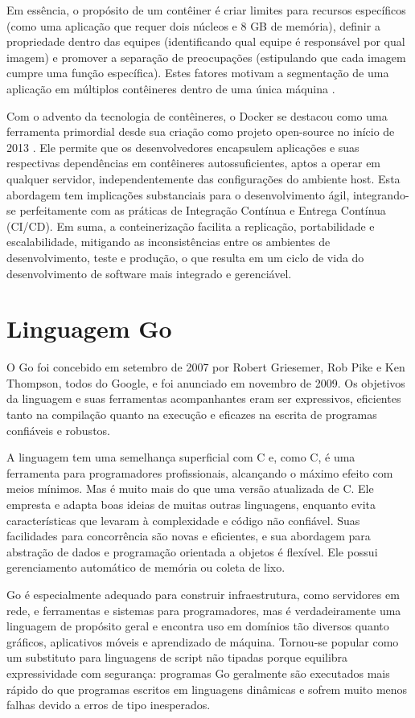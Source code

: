 \documentclass[12pt, %
openright, 
oneside, %
a4paper,    %
brazil]{facom-ufu-abntex2}
\begin{document}
Em essência, o propósito de um contêiner é criar limites para recursos
específicos (como uma aplicação que requer dois núcleos e 8 GB de memória),
definir a propriedade dentro das equipes (identificando qual equipe é
responsável por qual imagem) e promover a separação de preocupações
(estipulando que cada imagem cumpre uma função específica). Estes fatores
motivam a segmentação de uma aplicação em múltiplos contêineres dentro de uma
única máquina \cite{burns2018designingpart1}.

Com o advento da tecnologia de contêineres, o Docker se destacou como uma
ferramenta primordial desde sua criação como projeto open-source no início de
2013 \cite{merkel2014}. Ele permite que os desenvolvedores encapsulem
aplicações e suas respectivas dependências em contêineres autossuficientes,
aptos a operar em qualquer servidor, independentemente das configurações do
ambiente host. Esta abordagem tem implicações substanciais para o
desenvolvimento ágil, integrando-se perfeitamente com as práticas de Integração
Contínua e Entrega Contínua (CI/CD). Em suma, a conteinerização facilita a
replicação, portabilidade e escalabilidade, mitigando as inconsistências entre
os ambientes de desenvolvimento, teste e produção, o que resulta em um ciclo de
vida do desenvolvimento de software mais integrado e gerenciável.

\section{Linguagem Go}

O Go foi concebido em setembro de 2007 por Robert Griesemer, Rob Pike e Ken
Thompson, todos do Google, e foi anunciado em novembro de 2009. Os objetivos da
linguagem e suas ferramentas acompanhantes eram ser expressivos, eficientes
tanto na compilação quanto na execução e eficazes na escrita de programas
confiáveis e robustos.

A linguagem tem uma semelhança superficial com C e, como C, é uma ferramenta
para programadores profissionais, alcançando o máximo efeito com meios mínimos.
Mas é muito mais do que uma versão atualizada de C. Ele empresta e adapta boas
ideias de muitas outras linguagens, enquanto evita características que levaram
à complexidade e código não confiável. Suas facilidades para concorrência são
novas e eficientes, e sua abordagem para abstração de dados e programação
orientada a objetos é flexível. Ele possui gerenciamento automático de memória
ou coleta de lixo.

Go é especialmente adequado para construir infraestrutura, como servidores em
rede, e ferramentas e sistemas para programadores, mas é verdadeiramente uma
linguagem de propósito geral e encontra uso em domínios tão diversos quanto
gráficos, aplicativos móveis e aprendizado de máquina. Tornou-se popular como
um substituto para linguagens de script não tipadas porque equilibra
expressividade com segurança: programas Go geralmente são executados mais
rápido do que programas escritos em linguagens dinâmicas e sofrem muito menos
falhas devido a erros de tipo inesperados.
\end{document}

